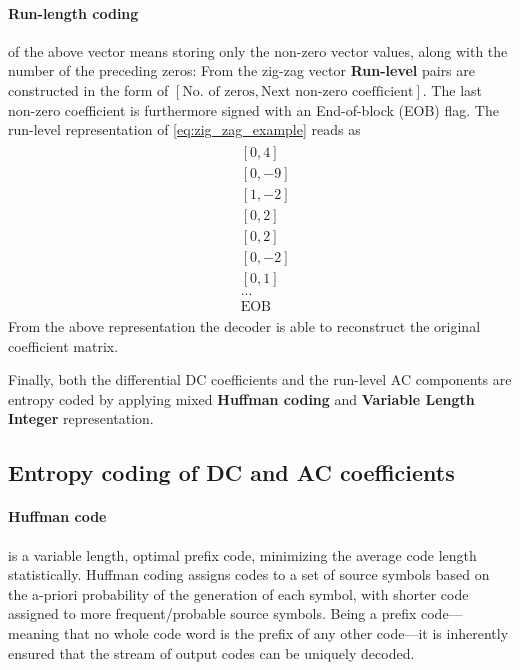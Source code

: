 \paragraph{Run-length coding} of the above vector means storing only the non-zero vector values, along with the number of the preceding zeros:
From the zig-zag vector \textbf{Run-level} pairs are constructed in the form of $\left[ \text{No. of zeros}, \text{Next non-zero coefficient} \right]$.
The last non-zero coefficient is furthermore signed with an End-of-block (EOB) flag.
The run-level representation of \eqref{eq:zig_zag_example} reads as
\begin{align*}
\begin{split}
&[0,4]\\
&[0,-9]\\
&[1,-2]\\
&[0,2]\\
&[0,2]\\
&[0,-2]\\
&[0,1]\\
& ...\\
& \text{EOB}
\end{split}
\end{align*}
From the above representation the decoder is able to reconstruct the original coefficient matrix.

Finally, both the differential DC coefficients and the run-level AC components are entropy coded by applying mixed \textbf{Huffman coding} and \textbf{Variable Length Integer} representation.

\subsection{Entropy coding of DC and AC coefficients}

\paragraph{Huffman code} is a variable length, optimal prefix code, minimizing the average code length statistically.
Huffman coding assigns codes to a set of source symbols based on the a-priori probability of the generation of each symbol, with shorter code assigned to more frequent/probable source symbols.
Being a prefix code---meaning that no whole code word is the prefix of any other code---it is inherently ensured that the stream of output codes can be uniquely decoded.

